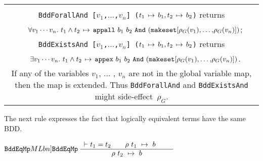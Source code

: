 \documentclass[12pt]{article}
\newcommand{\bnind}[1]{\index[MLbn]{#1}}
\newlength{\minipagewidth}
\newcommand{\ty}[1]{\mbox{\tt #1}}
\newcommand{\ml}[1]{{\tt #1}}
\newcommand{\termbdd}[3]{\mbox{$#1~#2~\mapsto~#3$}}
\newcommand{\globtermbdd}[2]{\mbox{$#1\hspace{0.5mm}\mapsto\hspace{0.5mm}#2$}}
\newcommand\termbddty{\ty{term\_bdd}}
\newcommand\fun{\mbox{\tt{->}}}
\renewcommand{\prod}{\mbox{\tt{*}}}
\begin{document}
\begin{flushleft}
\begin{tabular}{|c|}\hline
\begin{minipage}{\minipagewidth}
\smallskip
\begin{footnotesize}
\begin{description}

\item $\ml{BddForallAnd}\bnind{\ml{BddForallAnd}}, \ml{BddExistsAnd}\bnind{\ml{BddExistsAnd}} : 
\ty{term list}\fun(\termbddty\prod\termbddty)\fun\termbddty$\\
\ml{BddForallAnd~[$v_1$,$\ldots$,$v_n$]~($\globtermbdd{t_1}{b_1}, \globtermbdd{t_2}{b_2}$)} returns\\
\mbox{}~ $\globtermbdd{\forall v_1\cdots v_n.~t_1 \wedge t_2}{\ml{appall}~b_1~b_2~\ml{And}~\ml{(makeset[}\rho_G(v_1)\ml{,}\ldots\ml{,}\rho_G(v_n)\ml{])}}$;\\
\ml{BddExistsAnd~[$v_1$,$\ldots$,$v_n$]~($\globtermbdd{t_1}{b_1}, \globtermbdd{t_2}{b_2}$)} returns\\
\mbox{}~ $\globtermbdd{\exists v_1\cdots v_n.~t_1 \wedge t_2}{\ml{appex}~b_1~b_2~\ml{And}~\ml{(makeset[}\rho_G(v_1)\ml{,}\ldots\ml{,}\rho_G(v_n)\ml{])}}$.\\
If any of the variables $v_1$, $\ldots$ , $v_n$ are not in the global variable map, then the map
is extended. Thus \ml{BddForallAnd} and \ml{BddExistsAnd} might side-effect~$\rho_G$.


\end{description}
\end{footnotesize}
\smallskip
\end{minipage}\\ \hline
\end{tabular}
\end{flushleft}

The next rule expresses the fact that logically equivalent terms
have the same BDD.

\smallskip

$\ml{BddEqMp}\bnind{\ml{BddEqMp}}~\begin{array}{c}
\vdash t_1=t_2 \qquad \termbdd{\rho}{t_1}{b} \qquad 
\\ \hline
\termbdd{\rho}{t_2}{b}
\end{array}$
\end{document}
